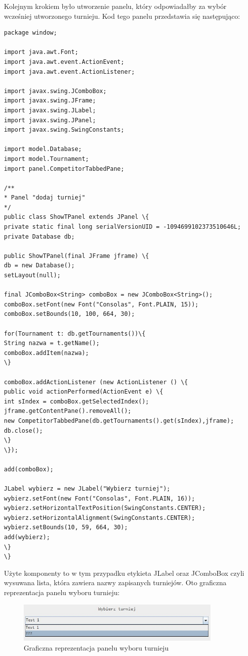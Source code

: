 Kolejnym krokiem było utworzenie panelu, który odpowiadałby za wybór wcześniej utworzonego turnieju. Kod tego panelu przedstawia się następująco:
\begin{verbatim}
package window;

import java.awt.Font;
import java.awt.event.ActionEvent;
import java.awt.event.ActionListener;

import javax.swing.JComboBox;
import javax.swing.JFrame;
import javax.swing.JLabel;
import javax.swing.JPanel;
import javax.swing.SwingConstants;

import model.Database;
import model.Tournament;
import panel.CompetitorTabbedPane;

/**
* Panel "dodaj turniej"
*/
public class ShowTPanel extends JPanel \{
private static final long serialVersionUID = -1094699102373510646L;
private Database db;

public ShowTPanel(final JFrame jframe) \{
db = new Database();
setLayout(null);

final JComboBox<String> comboBox = new JComboBox<String>();
comboBox.setFont(new Font("Consolas", Font.PLAIN, 15));
comboBox.setBounds(10, 100, 664, 30);

for(Tournament t: db.getTournaments())\{
String nazwa = t.getName();
comboBox.addItem(nazwa);
\}

comboBox.addActionListener (new ActionListener () \{
public void actionPerformed(ActionEvent e) \{
int sIndex = comboBox.getSelectedIndex();
jframe.getContentPane().removeAll();
new CompetitorTabbedPane(db.getTournaments().get(sIndex),jframe);
db.close();
\}
\});

add(comboBox);

JLabel wybierz = new JLabel("Wybierz turniej");
wybierz.setFont(new Font("Consolas", Font.PLAIN, 16));
wybierz.setHorizontalTextPosition(SwingConstants.CENTER);
wybierz.setHorizontalAlignment(SwingConstants.CENTER);
wybierz.setBounds(10, 59, 664, 30);
add(wybierz);		
\}	
\}
\end{verbatim}
Użyte komponenty to w tym przypadku etykieta JLabel oraz JComboBox czyli wysuwana lista, która zawiera nazwy zapisanych turniejów. Oto graficzna reprezentacja panelu wyboru turnieju:
\begin{figure}[H]
	\centering
	\includegraphics[width=10cm]{fig/m3}
	\caption{Graficzna reprezentacja panelu wyboru turnieju}
	\label {fig:G} 
\end{figure}

